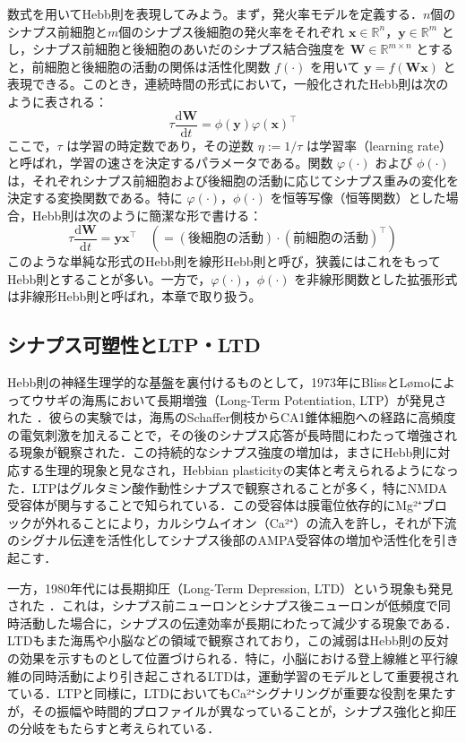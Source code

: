 \documentclass[titlepage]{ltjsbook}
\begin{document}
数式を用いてHebb則を表現してみよう。まず，発火率モデルを定義する．$n$個のシナプス前細胞と$m$個のシナプス後細胞の発火率をそれぞれ $\mathbf{x} \in \mathbb{R}^n$，$\mathbf{y} \in \mathbb{R}^m$ とし，シナプス前細胞と後細胞のあいだのシナプス結合強度を $\mathbf{W} \in \mathbb{R}^{m \times n}$ とすると，前細胞と後細胞の活動の関係は活性化関数 $f(\cdot)$ を用いて $\mathbf{y} = f(\mathbf{W}\mathbf{x})$ と表現できる。このとき，連続時間の形式において，一般化されたHebb則は次のように表される：
\begin{equation}
\tau \frac{\mathrm{d}\mathbf{W}}{\mathrm{d}t} = \phi(\mathbf{y}) \varphi(\mathbf{x})^\top
\end{equation}
ここで，$\tau$ は学習の時定数であり，その逆数 $\eta := 1/\tau$ は学習率（learning rate）と呼ばれ，学習の速さを決定するパラメータである。関数 $\varphi(\cdot)$ および $\phi(\cdot)$ は，それぞれシナプス前細胞および後細胞の活動に応じてシナプス重みの変化を決定する変換関数である。特に $\varphi(\cdot)$，$\phi(\cdot)$ を恒等写像（恒等関数）とした場合，Hebb則は次のように簡潔な形で書ける：
\begin{equation}
\tau \dfrac{\mathrm{d}\mathbf{W}}{\mathrm{d}t} = \mathbf{y} \mathbf{x}^\top\quad \left(= (\textrm{後細胞の活動}) \cdot (\textrm{前細胞の活動})^\top\right)
\end{equation}
このような単純な形式のHebb則を線形Hebb則と呼び，狭義にはこれをもってHebb則とすることが多い。一方で，$\varphi(\cdot)$，$\phi(\cdot)$ を非線形関数とした拡張形式は非線形Hebb則と呼ばれ，本章で取り扱う。

\subsection{シナプス可塑性とLTP・LTD}
Hebb則の神経生理学的な基盤を裏付けるものとして，1973年にBlissとLømoによってウサギの海馬において長期増強（Long-Term Potentiation, LTP）が発見された \citep{Bliss1973-vj}．彼らの実験では，海馬のSchaffer側枝からCA1錐体細胞への経路に高頻度の電気刺激を加えることで，その後のシナプス応答が長時間にわたって増強される現象が観察された．この持続的なシナプス強度の増加は，まさにHebb則に対応する生理的現象と見なされ，Hebbian plasticityの実体と考えられるようになった．LTPはグルタミン酸作動性シナプスで観察されることが多く，特にNMDA受容体が関与することで知られている．この受容体は膜電位依存的にMg²⁺ブロックが外れることにより，カルシウムイオン（Ca²⁺）の流入を許し，それが下流のシグナル伝達を活性化してシナプス後部のAMPA受容体の増加や活性化を引き起こす．

一方，1980年代には長期抑圧（Long-Term Depression, LTD）という現象も発見された \citep{Dudek1992-nz}．これは，シナプス前ニューロンとシナプス後ニューロンが低頻度で同時活動した場合に，シナプスの伝達効率が長期にわたって減少する現象である．LTDもまた海馬や小脳などの領域で観察されており，この減弱はHebb則の反対の効果を示すものとして位置づけられる．特に，小脳における登上線維と平行線維の同時活動により引き起こされるLTDは，運動学習のモデルとして重要視されている．LTPと同様に，LTDにおいてもCa²⁺シグナリングが重要な役割を果たすが，その振幅や時間的プロファイルが異なっていることが，シナプス強化と抑圧の分岐をもたらすと考えられている．
\end{document}
